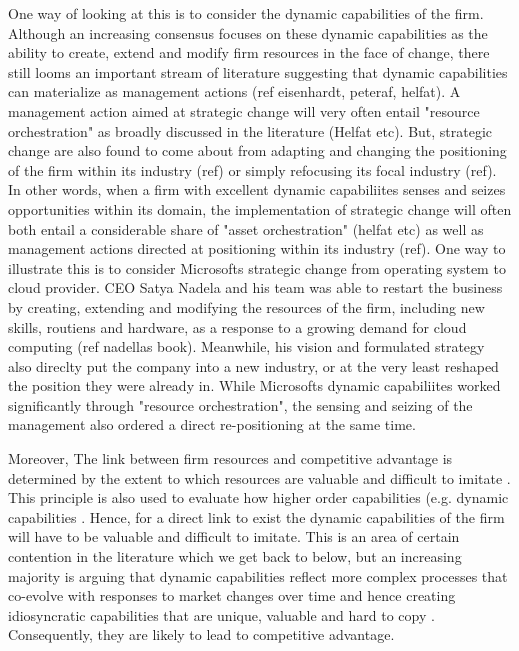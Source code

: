 One way of looking at this is to consider the dynamic capabilities of the firm. Although
an increasing consensus focuses on these dynamic capabilities as the ability to create,
extend and modify firm resources in the face of change, there still looms an important
stream of literature suggesting that dynamic capabilities can materialize as management
actions (ref eisenhardt, peteraf, helfat). A management action aimed at strategic change
will very often entail "resource orchestration" as broadly discussed in the literature
(Helfat etc). But, strategic change are also found to come about from adapting and
changing the positioning of the firm within its industry (ref) or simply refocusing its
focal industry (ref). In other words, when a firm with excellent dynamic capabiliites
senses and seizes opportunities within its domain, the implementation of strategic change
will often both entail a considerable share of "asset orchestration" (helfat etc) as well
as management actions directed at positioning within its industry (ref). One way to
illustrate this is to consider Microsofts strategic change from operating system to cloud
provider. CEO Satya Nadela and his team was able to restart the business by creating,
extending and modifying the resources of the firm, including new skills, routiens and
hardware, as a response to a growing demand for cloud computing (ref nadellas
book). Meanwhile, his vision and formulated strategy also direclty put the company into a
new industry, or at the very least reshaped the position they were already in. While
Microsofts dynamic capabiliites worked significantly through "resource orchestration",
the sensing and seizing of the management also ordered a direct re-positioning at the same
time.  

Moreover, The link between firm resources and competitive advantage is determined by the
extent to which resources are valuable and difficult to imitate \citep{Barney1991a}. This
principle is also used to evaluate how higher order capabilities (e.g. dynamic
capabilities \citep{Winter2003,Collis1994,Teece2007}. Hence, for a direct link to exist
the dynamic capabilities of the firm will have to be valuable and difficult to
imitate. This is an area of certain contention in the literature \citep{Peteraf2013} which
we get back to below, but an increasing majority is arguing that dynamic capabilities
reflect more complex processes that co-evolve with responses to market changes over time
and hence creating idiosyncratic capabilities that are unique, valuable and hard to copy
\citep{Helfat2007,Arndt2018}. Consequently, they are likely to lead to competitive
advantage.

